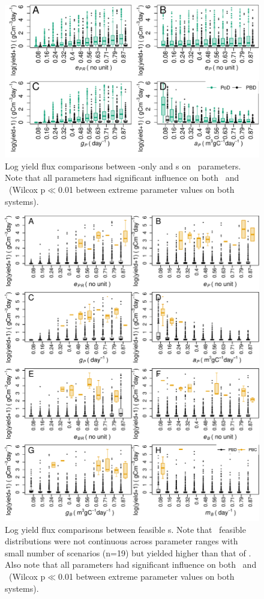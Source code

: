 \documentclass[../thesis.tex]{subfiles} %
\begin{document}
\begin{figure}[H]
    \centering
    \includegraphics[width=\linewidth]{result/bacEff1.pdf}
    \caption[Log yield flux comparisons between feasible \phy-only and \pbs s]{Log yield flux comparisons between \phy-only and \pbs s on \phy\ parameters.  Note that all parameters had significant influence on both \PoN\ and \PBN\ (Wilcox p$\ll$0.01 between extreme parameter values on both systems).}
    \label{f:bacEffect}
\end{figure}

\begin{figure}[H]
    \centering
    \includegraphics[width=\linewidth]{result/harvB.pdf}
    \caption[Log yield flux comparisons between feasible \pbs s]{Log yield flux comparisons between feasible \pbs s.  Note that \PBH\ feasible distributions were not continuous across parameter ranges with small number of scenarios (n=19) but yielded higher than that of \PBN.  Also note that all parameters had significant influence on both \PBN\ and \PBH\ (Wilcox p$\ll$0.01 between extreme parameter values on both systems).}
    \label{f:harvPB}
\end{figure}
\end{document}
